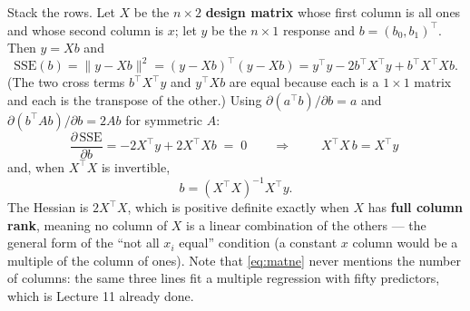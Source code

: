 \documentclass[11pt]{article}
\begin{document}
Stack the rows. Let $X$ be the $n\times 2$ \textbf{design matrix} whose first
column is all ones and whose second column is $x$; let $y$ be the $n\times 1$
response and $b = (b_0, b_1)^{\!\top}$. Then $\hat y = Xb$ and
\begin{equation}
  \mathrm{SSE}(b) = \lVert y - Xb\rVert^2 = (y - Xb)^{\!\top}(y - Xb)
    = y^{\!\top}y - 2b^{\!\top}X^{\!\top}y + b^{\!\top}X^{\!\top}Xb .
  \label{eq:matsse}
\end{equation}
(The two cross terms $b^{\!\top}X^{\!\top}y$ and $y^{\!\top}Xb$ are equal
because each is a $1\times1$ matrix and each is the transpose of the other.)
Using $\partial(a^{\!\top}b)/\partial b = a$ and
$\partial(b^{\!\top}Ab)/\partial b = 2Ab$ for symmetric $A$:
\begin{equation}
  \frac{\partial\,\mathrm{SSE}}{\partial b} = -2X^{\!\top}y + 2X^{\!\top}Xb
  \;=\; 0
  \qquad\Longrightarrow\qquad
  \boxed{\;X^{\!\top}\!X\,b = X^{\!\top}y\;}
  \label{eq:matne}
\end{equation}
and, when $X^{\!\top}\!X$ is invertible,
\begin{equation}
  b = (X^{\!\top}\!X)^{-1}X^{\!\top}y .
  \label{eq:ols}
\end{equation}
The Hessian is $2X^{\!\top}\!X$, which is positive definite exactly when $X$
has \textbf{full column rank}, meaning no column of $X$ is a linear
combination of the others --- the general form of the ``not all $x_i$
equal'' condition (a constant $x$ column would be a multiple of the column
of ones). Note that \eqref{eq:matne} never mentions the number of columns:
the same three lines fit a multiple regression with fifty predictors, which is
Lecture 11 already done.
\end{document}
